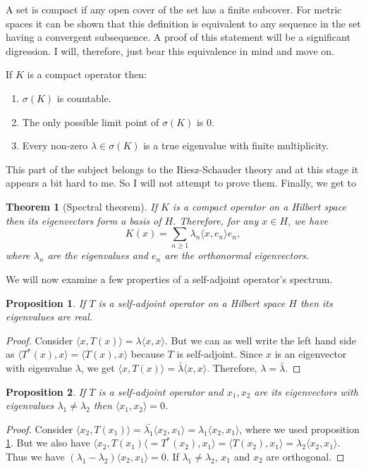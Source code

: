 \documentclass{article}
\theoremstyle{plain}
\newtheorem{thm}{Theorem}
\numberwithin{thm}{section}
\theoremstyle{plain}
\newtheorem{prop}{Proposition}
\numberwithin{prop}{section}
\theoremstyle{definition}
\numberwithin{defn}{section}
\theoremstyle{remark}
\numberwithin{equation}{section}
\begin{document}
A set is compact if any open cover of the set has a finite subcover. For metric
spaces it can be shown that this definition is equivalent to any sequence in 
the set having a convergent subsequence. A proof of this statement will be a
significant digression. I will, therefore, just bear this equivalence in mind
and move on.

If $K$ is a compact operator then:
\begin{enumerate}
\item $\sigma(K)$ is countable.
\item The only possible limit point of $\sigma(K)$ is $0$.
\item Every non-zero $\lambda \in \sigma(K)$ is a true eigenvalue with finite
multiplicity.
\end{enumerate}
This part of the subject belongs to the Riesz-Schauder theory and at this stage
it appears a bit hard to me. So I will not attempt to prove them. Finally, we
get to
\begin{thm}[Spectral theorem]
If $K$ is a compact operator on a Hilbert space then its eigenvectors form a
basis of $H$. Therefore, for any $x \in H$, we have
\[
K(x) = \sum_{n \ge 1} \lambda_n \langle x, e_n\rangle e_n,
\]
where $\lambda_n$ are the eigenvalues and $e_n$ are the orthonormal eigenvectors.
\end{thm}

We will now examine a few properties of a self-adjoint operator's spectrum.
\begin{prop}\label{s5p4}
If $T$ is a self-adjoint operator on a Hilbert space $H$ then its eigenvalues
are real.
\end{prop}
\begin{proof}
Consider $\langle x, T(x)\rangle = \lambda\langle x, x\rangle$. But we can
as well write the left hand side as $\langle T^\ast(x), x\rangle = \langle
T(x), x\rangle$ because $T$ is self-adjoint. Since $x$ is an eigenvector with 
eigenvalue $\lambda$, we get $\langle x, T(x)\rangle = \bar{\lambda}\langle x,
x\rangle$. Therefore, $\lambda = \bar{\lambda}$.
\end{proof}

\begin{prop}\label{s5p5}
If $T$ is a self-adjoint operator and $x_1, x_2$ are its eigenvectors with
eigenvalues $\lambda_1 \ne \lambda_2$ then $\langle x_1, x_2\rangle = 0$.
\end{prop}
\begin{proof}
Consider $\langle x_2, T(x_1)\rangle = \bar{\lambda_1}\langle x_2, x_1\rangle
= \lambda_1\langle x_2, x_1\rangle$, where we used proposition \ref{s5p4}. But
we also have $\langle x_2, T(x_1)\langle = T^\ast(x_2), x_1\rangle = 
\langle T(x_2), x_1\rangle = \lambda_2\langle x_2, x_1\rangle$. Thus we have
$(\lambda_1 - \lambda_2)\langle x_2, x_1\rangle = 0$. If $\lambda_1 \ne 
\lambda_2$, $x_1$ and $x_2$ are orthogonal.
\end{proof}
\end{document}
